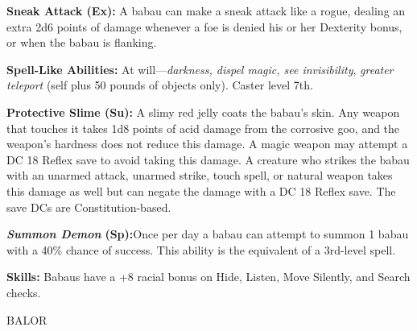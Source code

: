 \documentclass{article}
\begin{document}
\textbf{Sneak Attack (Ex): }A babau can make a sneak attack like a rogue, dealing 
an extra 2d6 points of damage whenever a foe is denied his or her Dexterity bonus, 
or when the babau is flanking.

\textbf{Spell-Like Abilities:} At will---\textit{darkness, dispel magic, see invisibility}, 
\textit{greater teleport }(self plus 50 pounds of objects only). Caster level 7th.

\textbf{Protective Slime (Su):} A slimy red jelly coats the babau's skin. Any weapon 
that touches it takes 1d8 points of acid damage from the corrosive goo, and the 
weapon's hardness does not reduce this damage. A magic weapon may attempt a DC 
18 Reflex save to avoid taking this damage. A creature who strikes the babau with 
an unarmed attack, unarmed strike, touch spell, or natural weapon takes this damage 
as well but can negate the damage with a DC 18 Reflex save. The save DCs are Constitution-based.

\textit{\textbf{Summon Demon }}\textbf{(Sp):}Once per day a babau can attempt to 
summon 1 babau with a 40\% chance of success. This ability is the equivalent of 
a 3rd-level spell.

\textbf{Skills:} Babaus have a +8 racial bonus on Hide, Listen, Move Silently, 
and Search checks.

\vspace{12pt}
BALOR
\end{document}
